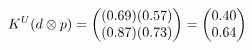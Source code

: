\documentclass[preview]{standalone}
\begin{document}
\begin{align*}
\special{dvisvgm:raw <g id='unique000'>}K^U(d \otimes p) = \begin{pmatrix} (0.69)(0.57) \\ (0.87)(0.73) \end{pmatrix} = \begin{pmatrix} 0.40 \\ 0.64 \end{pmatrix}\special{dvisvgm:raw </g>}
\end{align*}
\end{document}
